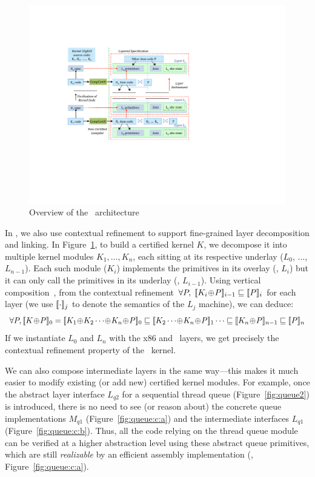 \begin{figure}[tb] \centering
\includegraphics[scale=1]{figs/archA}
\caption{Overview of the \CTOS\ architecture}
\hrulefill
\label{fig:arch}
\end{figure}

In \CTOS, we also use contextual refinement to support fine-grained
layer decomposition and linking.  In Figure~\ref{fig:arch}, to build a
certified kernel $K$, we decompose it into multiple kernel modules
$K_1,...,K_n$, each sitting at its respective underlay ($L_0$, ...,
$L_{n-1}$). Each such module ($K_i$) implements the primitives in its
overlay (\ie, $L_i$) but it can only call the primitives in its
underlay (\ie, $L_{i-1}$).  Using vertical composition~\cite{dscal15}, from
the contextual refinement $\forall
P,\;\sem{i-1}{K_i\join{}P}\Refrel{}\sem{i}{P}$ for each layer (we use
$\sem{j}{\cdot}$ to denote the semantics of the $L_j$ machine), we can
deduce:
$$\forall P, \sem{0}{K\join{}P} =
\sem{0}{K_1\join{}K_2\cdots\join{}K_n\join{}P} \Refrel
\sem{1}{K_2\cdots\join{}K_n\join{}P} \cdots \Refrel
\sem{n-1}{K_n\join{}P} \Refrel \sem{n}{P}$$
If we instantiate $L_0$
and $L_n$ with the x86 and \mCTOS\ layers, we get precisely the
contextual refinement property of the \mCTOS\ kernel. 

We can also
compose intermediate layers in the same way---this makes it much
easier to modify existing (or add new) certified kernel modules.
For example, once the abstract layer interface
$L_{q2}$
for a sequential thread queue (\cf{}Figure~\ref{fig:queue2}) is introduced,
there is no need to see (or reason about) 
the concrete queue implementations $M_{q1}$
(\cf{}Figure~\ref{fig:queue:c:a})
and the intermediate interfaces $L_{q1}$ (\cf{}Figure~\ref{fig:queue:c:b}). 
Thus, all the code relying on the thread queue module can be verified
at a higher abstraction level using these abstract queue primitives,
which are still {\em realizable} by an efficient assembly implementation
(\ie, Figure~\ref{fig:queue:c:a}).


